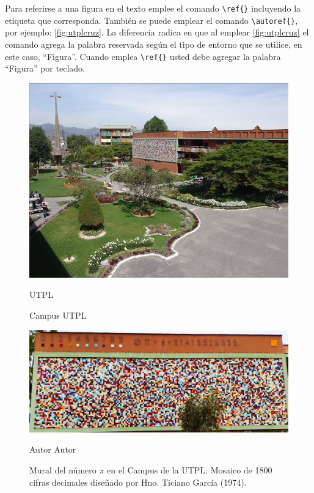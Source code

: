 Para referirse a una figura en el texto emplee el comando \lstinline|\ref{}| incluyendo la etiqueta que corresponda. También se puede emplear el comando \lstinline|\autoref{}|, por ejemplo: \autoref{fig:utplcruz}. La diferencia radica en que al emplear  \autoref{fig:utplcruz} el comando agrega la palabra reservada según el tipo de entorno que se utilice, en este caso, ``Figura''. Cuando emplea \lstinline|\ref{}| usted debe agregar la palabra ``Figura'' por teclado. 

\begin{figure}[h!]
	\centering
	\captionsetup{width=0.7\textwidth}
	\includegraphics[width=0.7\linewidth]{FIGURES/UTPL_cruz}
	\caption{Campus UTPL}
	\FigExtraCaptionUTPL 			%
		{\cite{utpl2008campus}}		%
		{UTPL}			%
	\label{fig:utplcruz}
\end{figure}

\begin{figure}[h!]
	\centering
	\captionsetup{width=0.9\textwidth}
	\includegraphics[width=0.9\linewidth]{FIGURES/UTPL_MuralPi}
	\caption{Mural del número $ \pi $ en el Campus de la UTPL: Mosaico de 1800 cifras decimales diseñado por Hno. Ticiano García (1974).}
	\FigExtraCaptionUTPL 			%
	{Autor}		%
	{Autor}      %
	\label{fig:utplcruz2}
\end{figure}

